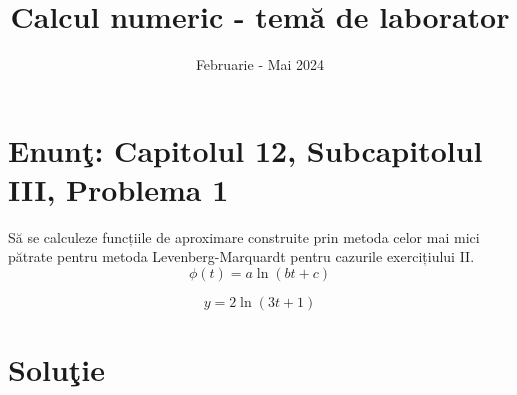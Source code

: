 \documentclass{article}
\begin{document}
\title{Calcul numeric - tem\u{a} de laborator}

\author{}

\date{Februarie - Mai 2024}

\maketitle              %








\section*{Enun\c{t}: Capitolul 12, Subcapitolul III, Problema 1}

S\u{a} se calculeze funcțiile de aproximare construite prin metoda celor mai
mici pătrate pentru metoda Levenberg-Marquardt pentru cazurile exercițiului II.
\[
\phi(t) = a \ln(bt + c)
\]

\[
y = 2 \ln(3t + 1)
\] 

\section*{Solu\c{t}ie}
\end{document}

